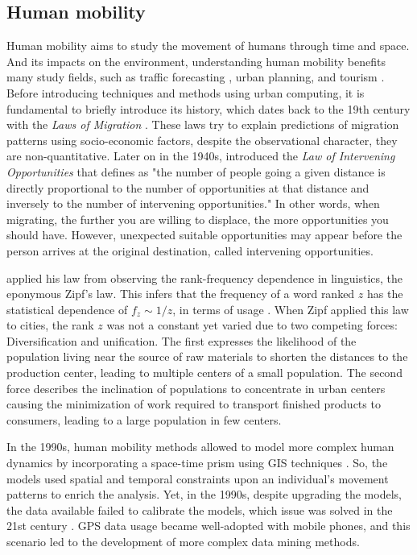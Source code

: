 \subsection{Human mobility}
Human mobility aims to study the movement of humans through time and space. And its
impacts on the environment, understanding human mobility benefits many study fields,
such as traffic forecasting \cite{GTFS-RT_delays_2022-ADWIN},
urban planning, 
and tourism \cite{Carvalho2018}. 
Before introducing techniques and methods using urban computing, it is
fundamental to briefly introduce its history, which dates
back to the 19th century with the {\em Laws of Migration} \cite{lawsofmigration}.
These laws try to explain predictions of migration patterns using 
socio-economic factors, despite the observational character, they are non-quantitative.
Later on in the 1940s,  introduced the 
{\em Law of Intervening Opportunities} that  defines
as "the number of people going a given distance is directly proportional to
the number of opportunities at that distance and inversely to the number of
intervening opportunities." In other words, when migrating, the further you are
willing to displace, the more opportunities you should have. However, unexpected 
suitable opportunities may appear before the person arrives at the original destination,
called intervening opportunities.

 applied his law from observing the rank-frequency dependence in linguistics, the eponymous Zipf's law.
This infers that the frequency of a word ranked $z$ has the statistical dependence
of $f_z \sim 1/z$, in terms of usage \cite{human_mobility_SLR}. When Zipf applied
this law to cities, the rank $z$ was not a constant yet varied due to two competing
forces: Diversification and unification. The first expresses
the likelihood of the population living near the source of raw materials to 
shorten the distances to the production center, leading to multiple centers of a small population. 
The second force describes the inclination of populations to concentrate in urban centers
causing the minimization of work required to transport finished products to consumers,
leading to a large population in few centers.

In the 1990s, human mobility methods allowed to model more complex human
dynamics by incorporating a space-time prism using \ac{GIS} techniques
\cite{spacetime1991}. So, the models used spatial and temporal
constraints upon an individual's movement patterns to enrich the analysis.
Yet, in the 1990s, despite upgrading the models, the data available failed to
calibrate the models, which issue was solved in the 21st century
\cite{human_mobility_SLR}. GPS data usage became well-adopted with
mobile phones, and this scenario led to the development of 
more complex data mining methods. 

